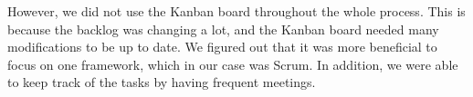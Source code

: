 However, we did not use the Kanban board throughout the whole process. This is because the backlog was changing a lot, and the Kanban board needed many modifications to be up to date. We figured out that it was more beneficial to focus on one framework, which in our case was Scrum. In addition, we were able to keep track of the tasks by having frequent meetings. 